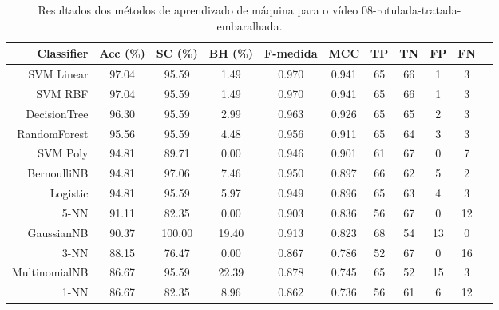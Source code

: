 \begin{table}[!htb]
\centering
\caption{Resultados dos métodos de aprendizado de máquina para o vídeo 08-rotulada-tratada-embaralhada.}
\label{tab:08-rotulada-tratada-embaralhada}
\begin{tabular}{r|c|c|c|c|c|c|c|c|c|c}
\hline\hline
Classifier & Acc (\%) & SC (\%) & BH (\%) & F-medida & MCC & TP & TN & FP & FN \\ \hline
SVM Linear & 97.04 & 95.59 & 1.49 & 0.970 & 0.941 & 65 & 66 & 1 & 3 \\ 
SVM RBF & 97.04 & 95.59 & 1.49 & 0.970 & 0.941 & 65 & 66 & 1 & 3 \\ 
DecisionTree & 96.30 & 95.59 & 2.99 & 0.963 & 0.926 & 65 & 65 & 2 & 3 \\ 
RandomForest & 95.56 & 95.59 & 4.48 & 0.956 & 0.911 & 65 & 64 & 3 & 3 \\ 
SVM Poly & 94.81 & 89.71 & 0.00 & 0.946 & 0.901 & 61 & 67 & 0 & 7 \\ 
BernoulliNB & 94.81 & 97.06 & 7.46 & 0.950 & 0.897 & 66 & 62 & 5 & 2 \\ 
Logistic & 94.81 & 95.59 & 5.97 & 0.949 & 0.896 & 65 & 63 & 4 & 3 \\ 
5-NN & 91.11 & 82.35 & 0.00 & 0.903 & 0.836 & 56 & 67 & 0 & 12 \\ 
GaussianNB & 90.37 & 100.00 & 19.40 & 0.913 & 0.823 & 68 & 54 & 13 & 0 \\ 
3-NN & 88.15 & 76.47 & 0.00 & 0.867 & 0.786 & 52 & 67 & 0 & 16 \\ 
MultinomialNB & 86.67 & 95.59 & 22.39 & 0.878 & 0.745 & 65 & 52 & 15 & 3 \\ 
1-NN & 86.67 & 82.35 & 8.96 & 0.862 & 0.736 & 56 & 61 & 6 & 12 \\ 
\hline\hline
\end{tabular}
\end{table}
